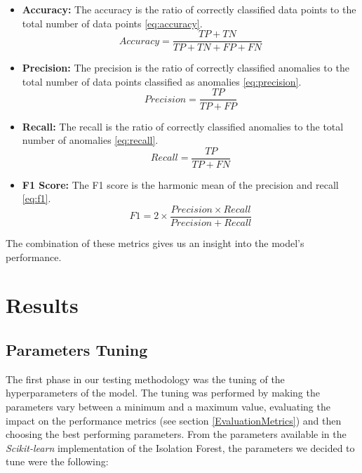 \documentclass[futureinternet,article,submit,pdftex,moreauthors]{Definitions/mdpi}
\begin{document}
\begin{itemize}
	\item \textbf{Accuracy:} The accuracy is the ratio of correctly classified data points to the total number of data points \ref{eq:accuracy}.
	\begin{equation}
		\label{eq:accuracy}
	  Accuracy = \frac{TP + TN}{TP + TN + FP + FN}
	\end{equation}
	\item \textbf{Precision:} The precision is the ratio of correctly classified anomalies to the total number of data points classified as anomalies \ref{eq:precision}.
	\begin{equation}
		\label{eq:precision}
	  Precision = \frac{TP}{TP + FP}
	\end{equation}
	\item \textbf{Recall:} The recall is the ratio of correctly classified anomalies to the total number of anomalies \ref{eq:recall}.
	\begin{equation}
		\label{eq:recall}
	  Recall = \frac{TP}{TP + FN}
	\end{equation}
	\item \textbf{F1 Score:} The F1 score is the harmonic mean of the precision and recall \ref{eq:f1}.
	\begin{equation}
		\label{eq:f1}
	  F1 = 2 \times \frac{Precision \times Recall}{Precision + Recall}
	\end{equation}
\end{itemize}

The combination of these metrics gives us an insight into the model's performance. 

\section{Results}

\subsection{Parameters Tuning}

The first phase in our testing methodology was the tuning of the hyperparameters of the model. The tuning was performed by making the parameters vary between a minimum and a maximum value, evaluating the impact on the performance metrics (see section \ref{EvaluationMetrics}) and then choosing the best performing parameters.
From the parameters available in the \textit{Scikit-learn} implementation of the Isolation Forest, the parameters we decided to tune were the following: 
\end{document}
